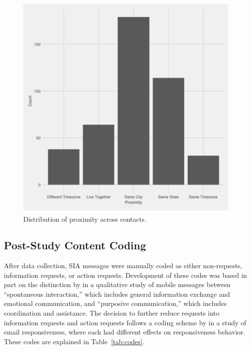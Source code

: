 \documentclass[12pt]{nuthesis}	%
\begin{document}
\begin{figure}[h]
\centering
\includegraphics[width=.7\textwidth]{figures/proximity_distribution}
\caption{Distribution of proximity across contacts.}
\label{fig:proximity}
\end{figure}


\subsection{Post-Study Content Coding}

After data collection, SIA messages were manually coded as either non-requests, information requests, or action requests. Development of these codes was based in part on the distinction by \citet{cui2016beyond} in a qualitative study of mobile messages between ``spontaneous interaction,'' which includes general information exchange and emotional communication, and ``purposive communication,'' which includes coordination and assistance. The decision to further reduce requests into information requests and action requests follows a coding scheme by \citet{dabbish2005understanding} in a study of email responsiveness, where each had different effects on responsiveness behavior. These codes are explained in Table~\ref{tab:codes}.
\end{document}
